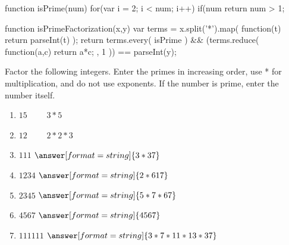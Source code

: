 \documentclass[nooutcomes]{ximera}
\begin{document}


\begin{javascript}
function isPrime(num) {
  for(var i = 2; i < num; i++)
    if(num %
  return num > 1;
}

function isPrimeFactorization(x,y) {
  var terms = x.split('*').map( function(t) { return parseInt(t) } );
  return terms.every( isPrime ) &&
    (terms.reduce( function(a,c) { return a*c; }, 1 )) == parseInt(y);
}
\end{javascript}



\begin{problem}
Factor the following integers.  Enter the primes in increasing order, use * for multiplication, and do not use exponents.  If the number is prime, enter the number itself.
\begin{enumerate}
\item $15\qquad$ $3*5$
\item $12\qquad$ $2*2*3$
\item $111$     $\answer[format=string]{3*37}$
\item $1234$    $\answer[format=string]{2*617}$
\item $2345$    $\answer[format=string]{5*7*67}$
\item $4567$    $\answer[format=string]{4567}$
\item $111111$  $\answer[format=string]{3*7*11*13*37}$
\end{enumerate}
\end{problem}
\end{document}
